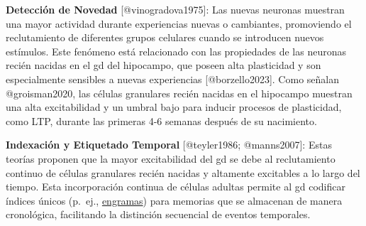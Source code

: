 \documentclass[
  11pt]{../MastersDoctoralThesisUNAM}
\begin{document}
\begin{tcolorbox}[enhanced jigsaw, colframe=quarto-callout-warning-color-frame, left=2mm, bottomrule=.15mm, rightrule=.15mm, arc=.35mm, toprule=.15mm, leftrule=.75mm, breakable, opacityback=0, colback=white]
\begin{figure}[H]
\end{figure}%

\textbf{Detección de Novedad} {[}@vinogradova1975{]}: Las nuevas
neuronas muestran una mayor actividad durante experiencias nuevas o
cambiantes, promoviendo el reclutamiento de diferentes grupos celulares
cuando se introducen nuevos estímulos. Este fenómeno está relacionado
con las propiedades de las neuronas recién nacidas en el \ac{gd} del
hipocampo, que poseen alta plasticidad y son especialmente sensibles a
nuevas experiencias {[}@borzello2023{]}. Como señalan @groisman2020, las
células granulares recién nacidas en el hipocampo muestran una alta
excitabilidad y un umbral bajo para inducir procesos de plasticidad,
como LTP, durante las primeras 4-6 semanas después de su nacimiento.

\textbf{Indexación y Etiquetado Temporal} {[}@teyler1986; @manns2007{]}:
Estas teorías proponen que la mayor excitabilidad del \ac{gd} se debe al
reclutamiento continuo de células granulares recién nacidas y altamente
excitables a lo largo del tiempo. Esta incorporación continua de células
adultas permite al \ac{gd} codificar índices únicos (p.~ej.,
\href{AppendixB.qmd\#term-id-1}{engramas}) para memorias que se
almacenan de manera cronológica, facilitando la distinción secuencial de
eventos temporales.

\end{tcolorbox}
\end{document}
